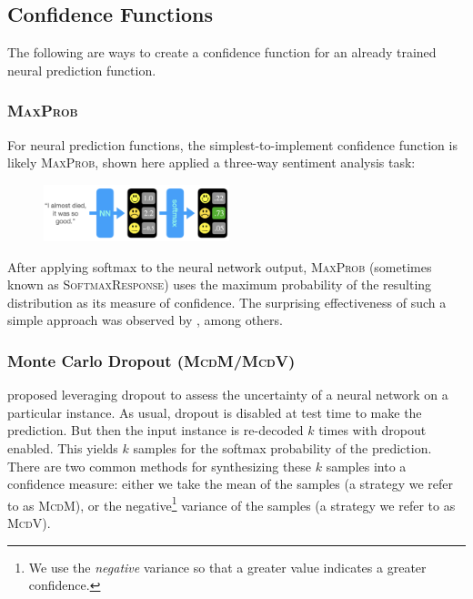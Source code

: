 \documentclass[11pt]{article}
\begin{document}
\subsection{Confidence Functions}

The following are ways to create a confidence function for an already trained neural prediction function.

\subsubsection*{\textsc{MaxProb}}

For neural prediction functions, the simplest-to-implement confidence function is likely \textsc{MaxProb}, shown here applied a three-way sentiment analysis task:
\begin{figure}[h]
\centering
\includegraphics[width=0.48\textwidth]{softmax.png}
\label{fig:softmax}
\vspace{-10pt}
\end{figure}

\noindent After applying softmax to the neural network output, \textsc{MaxProb} (sometimes known as \textsc{SoftmaxResponse}) uses the maximum probability of the resulting distribution as its measure of confidence. The surprising effectiveness of such a simple approach was observed by \cite{HendrycksG17}, among others.

\subsubsection*{Monte Carlo Dropout (\textsc{McdM/McdV})}

\cite{gal2016dropout} proposed leveraging dropout \cite{srivastava2014} to assess the uncertainty of a neural network on a particular instance. As usual, dropout is disabled at test time to make the prediction. But then the input instance is re-decoded $k$ times with dropout enabled. This yields $k$ samples for the softmax probability of the prediction. There are two common methods \cite{kamath-etal-2020-selective} for synthesizing these $k$ samples into a confidence measure: either we take the mean \cite{lakshminarayanan2017simple} of the samples (a strategy we refer to as \textsc{McdM}), or the negative\footnote{We use the \emph{negative} variance  so that a greater value indicates a greater confidence.} variance \cite{feinman2017detecting,SmithG18} of the samples (a strategy we refer to as \textsc{McdV}).
\end{document}

